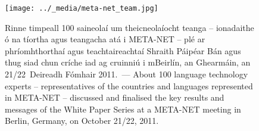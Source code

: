 \begin{figure}[htbp]
  \center
    \texttt{[image: ../\_media/meta-net\_team.jpg]}
  \caption{Rinne timpeall 100 saineolaí um theicneolaíocht teanga -- ionadaithe ó na tíortha agus teangacha atá i META-NET -- plé ar phríomhthorthaí agus teachtaireachtaí Shraith Páipéar Bán agus thug siad chun críche iad ag cruinniú i mBeirlín, an Ghearmáin, an 21/22~Deireadh Fómhair 2011.~--- \textcolor{grey1}{About 100 language technology experts -- representatives of the countries and languages represented in META-NET -- discussed and finalised the key results and messages of the White Paper Series at a META-NET meeting in Berlin, Germany, on October 21/22, 2011.}} %
 \medskip
\end{figure}

\cleardoublepage

{}
\label{whitepaperseries}

